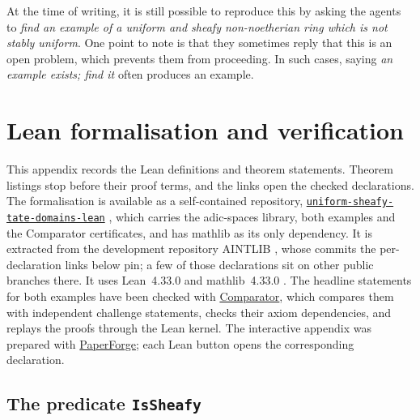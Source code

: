 \documentclass[11pt,reqno]{amsart}
\theoremstyle{definition}
\begin{document}
At the time of writing, it is still possible to reproduce this by asking the
agents to \emph{find an example of a uniform and sheafy non-noetherian ring
which is not stably uniform}.  One point to note is that they sometimes reply
that this is an open problem, which prevents them from proceeding.  In such
cases, saying \emph{an example exists; find it} often produces an example.

\appendix
\section{Lean formalisation and verification}\label{sec:formalisation}

This appendix records the Lean definitions and theorem statements.  Theorem
listings stop before their proof terms, and the links open the checked declarations.  The
formalisation is available as a self-contained repository,
\href{https://github.com/CBirkbeck/uniform-sheafy-tate-domains-lean}{\texttt{uniform-sheafy-tate-domains-lean}} \cite{SheafyLean},
which carries the adic-spaces library, both examples and the Comparator
certificates, and has mathlib as its only dependency.  It is extracted from the
development repository AINTLIB \cite{AINTLIB}, whose commits the per-declaration
links below pin; a few of those declarations sit on other public branches there.
It uses
Lean~4.33.0 \cite{Lean4} and mathlib~4.33.0 \cite{mathlib}.  The headline
statements for both examples have been checked with
\href{https://github.com/leanprover/comparator}{Comparator}, which compares
them with independent challenge statements, checks their axiom dependencies,
and replays the proofs through the Lean kernel.  The interactive appendix was
prepared with \href{https://github.com/roed-math/paperforge}{PaperForge}; each
Lean button opens the corresponding declaration.

\subsection{The predicate \texttt{IsSheafy}}
\end{document}
